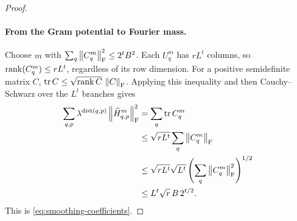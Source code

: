 \begin{proof}
\paragraph{From the Gram potential to Fourier mass.}
Choose $m$ with
$\sum_q\left\lVert C_q^m\right\rVert_{\mathrm F}^2\le2^tB^2$.
Each $U_q^m$ has $rL^t$ columns, so
$\operatorname{rank}(C_q^m)\le rL^t$, regardless of its row dimension.
For a positive semidefinite matrix $C$,
$\operatorname{tr} C\le\sqrt{\operatorname{rank} C}\,\left\lVert C\right\rVert_{\mathrm F}$.
Applying this inequality and then Cauchy--Schwarz over the $L^t$
branches gives
\[
\begin{split}
  \sum_{q,p}\lambda^{\operatorname{dist}(q,p)}
                     \left\lVert\widehat H_{q,p}^m\right\rVert_{\mathrm F}^2
  &=\sum_q\operatorname{tr} C_q^m\\
  &\le\sqrt{rL^t}\sum_q\left\lVert C_q^m\right\rVert_{\mathrm F}\\
  &\le\sqrt{rL^t}\sqrt{L^t}
            \left(\sum_q\left\lVert C_q^m\right\rVert_{\mathrm F}^2\right)^{1/2}\\
  &\le L^t\sqrt r\,B\,2^{t/2}.
\end{split}
\]
This is \eqref{eq:smoothing-coefficients}.
\end{proof}
